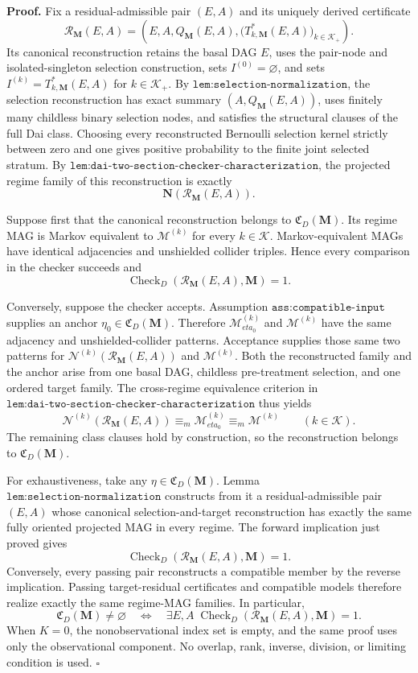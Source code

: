 \textbf{Proof.}
Fix a residual-admissible pair \((E,A)\) and its uniquely derived certificate
\[
\mathcal R_{\mathbf M}(E,A)
=\left(E,A,Q_{\mathbf M}(E,A),
\bigl(T^*_{k,\mathbf M}(E,A)\bigr)_{k\in\mathcal K_+}\right).
\]
Its canonical reconstruction retains the basal DAG \(E\), uses the pair-node and isolated-singleton selection construction, sets \(I^{(0)}=\varnothing\), and sets \(I^{(k)}=T^*_{k,\mathbf M}(E,A)\) for \(k\in\mathcal K_+\).  By \(\texttt{lem:selection-normalization}\), the selection reconstruction has exact summary \((A,Q_{\mathbf M}(E,A))\), uses finitely many childless binary selection nodes, and satisfies the structural clauses of the full Dai class.  Choosing every reconstructed Bernoulli selection kernel strictly between zero and one gives positive probability to the finite joint selected stratum.  By \(\texttt{lem:dai-two-section-checker-characterization}\), the projected regime family of this reconstruction is exactly
\[
\mathbf N(\mathcal R_{\mathbf M}(E,A)).
\]

Suppose first that the canonical reconstruction belongs to \(\mathfrak C_D(\mathbf M)\).  Its regime MAG is Markov equivalent to \(\mathcal M^{(k)}\) for every \(k\in\mathcal K\).  Markov-equivalent MAGs have identical adjacencies and unshielded collider triples.  Hence every comparison in the checker succeeds and
\[
\operatorname{Check}_{D}(\mathcal R_{\mathbf M}(E,A),\mathbf M)=1.
\]

Conversely, suppose the checker accepts.  Assumption \(\texttt{ass:compatible-input}\) supplies an anchor \(\eta_0\in\mathfrak C_D(\mathbf M)\).  Therefore \(\mathcal M_{eta_0}^{(k)}\) and \(\mathcal M^{(k)}\) have the same adjacency and unshielded-collider patterns.  Acceptance supplies those same two patterns for \(\mathcal N^{(k)}(\mathcal R_{\mathbf M}(E,A))\) and \(\mathcal M^{(k)}\).  Both the reconstructed family and the anchor arise from one basal DAG, childless pre-treatment selection, and one ordered target family.  The cross-regime equivalence criterion in \(\texttt{lem:dai-two-section-checker-characterization}\) thus yields
\[
\mathcal N^{(k)}(\mathcal R_{\mathbf M}(E,A))
\equiv_m\mathcal M_{eta_0}^{(k)}
\equiv_m\mathcal M^{(k)}
\qquad(k\in\mathcal K).
\]
The remaining class clauses hold by construction, so the reconstruction belongs to \(\mathfrak C_D(\mathbf M)\).

For exhaustiveness, take any \(\eta\in\mathfrak C_D(\mathbf M)\).  Lemma \(\texttt{lem:selection-normalization}\) constructs from it a residual-admissible pair \((E,A)\) whose canonical selection-and-target reconstruction has exactly the same fully oriented projected MAG in every regime.  The forward implication just proved gives
\[
\operatorname{Check}_{D}(\mathcal R_{\mathbf M}(E,A),\mathbf M)=1.
\]
Conversely, every passing pair reconstructs a compatible member by the reverse implication.  Passing target-residual certificates and compatible models therefore realize exactly the same regime-MAG families.  In particular,
\[
\mathfrak C_D(\mathbf M)\ne\varnothing
\quad\Longleftrightarrow\quad
\exists E,A\;
\operatorname{Check}_{D}(\mathcal R_{\mathbf M}(E,A),\mathbf M)=1.
\]
When \(K=0\), the nonobservational index set is empty, and the same proof uses only the observational component.  No overlap, rank, inverse, division, or limiting condition is used. \(\square\)